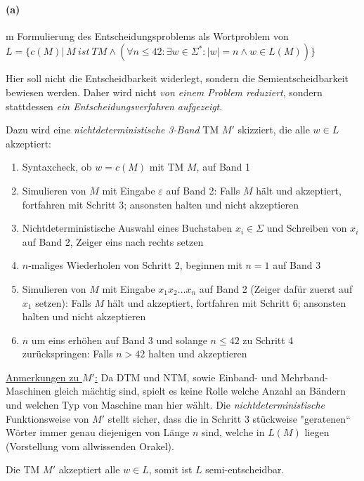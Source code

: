 
\paragraph{(a)}m
	Formulierung des Entscheidungsproblems als Wortproblem von\\
	$L=\{c(M)|\ M\ ist\ TM \wedge (\forall n \leq 42: \exists w \in \Sigma^*: |w|=n \wedge w \in L(M))\}$

	Hier soll nicht die Entscheidbarkeit widerlegt, sondern die Semientscheidbarkeit bewiesen werden. Daher wird nicht \textit{von einem Problem reduziert}, sondern stattdessen \textit{ein Entscheidungsverfahren aufgezeigt}.
	
	Dazu wird eine \textit{nichtdeterministische 3-Band} TM $M'$ skizziert, die alle $w \in L$ akzeptiert:
	\begin{enumerate}
		\item Syntaxcheck, ob $w=c(M)$ mit TM $M$, auf Band 1
		\item Simulieren von $M$ mit Eingabe $\varepsilon$ auf Band 2: Falls $M$ hält und akzeptiert, fortfahren mit Schritt 3; ansonsten halten und nicht akzeptieren
		\item Nichtdeterministische Auswahl eines Buchstaben $x_i \in \Sigma$ und Schreiben von $x_i$ auf Band 2, Zeiger eins nach rechts setzen
		\item $n$-maliges Wiederholen von Schritt 2, beginnen mit $n=1$ auf Band 3
		\item Simulieren von $M$ mit Eingabe $x_1x_2...x_n$ auf Band 2 (Zeiger dafür zuerst auf $x_1$ setzen): Falls $M$ hält und akzeptiert, fortfahren mit Schritt 6; ansonsten halten und nicht akzeptieren
		\item $n$ um eins erhöhen auf Band 3 und solange $n \leq 42$ zu Schritt 4 zurückspringen: Falls $n > 42$ halten und akzeptieren
	\end{enumerate}

	\underline{Anmerkungen zu $M'$:} Da DTM und NTM, sowie Einband- und Mehrband-Maschinen gleich mächtig sind, spielt es keine Rolle welche Anzahl an Bändern und welchen Typ von Maschine man hier wählt. Die \textit{nichtdeterministische} Funktionsweise von $M'$ stellt sicher, dass die in Schritt 3 stückweise "geratenen“ Wörter immer genau diejenigen von Länge $n$ sind, welche in $L(M)$ liegen (Vorstellung vom allwissenden Orakel).

	Die TM $M'$ akzeptiert alle $w \in L$, somit ist $L$ semi-entscheidbar.
	
